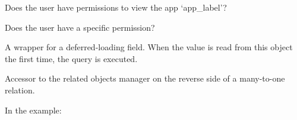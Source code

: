 \documentclass[letterpaper,10pt,english]{sphinxmanual}
\begin{document}
\begin{fulllineitems}
\begin{fulllineitems}
\end{fulllineitems}


\begin{fulllineitems}
\label{\detokenize{QuChemPedIA.models:QuChemPedIA.models.UserModel.Utilisateur.has_module_perms}}
Does the user have permissions to view the app ‘app\_label’?

\end{fulllineitems}


\begin{fulllineitems}
\label{\detokenize{QuChemPedIA.models:QuChemPedIA.models.UserModel.Utilisateur.has_perm}}
Does the user have a specific permission?

\end{fulllineitems}


\begin{fulllineitems}
\label{\detokenize{QuChemPedIA.models:QuChemPedIA.models.UserModel.Utilisateur.id}}
A wrapper for a deferred-loading field. When the value is read from this
object the first time, the query is executed.

\end{fulllineitems}


\begin{fulllineitems}
\label{\detokenize{QuChemPedIA.models:QuChemPedIA.models.UserModel.Utilisateur.importfile_set}}
Accessor to the related objects manager on the reverse side of a
many-to-one relation.

In the example:

%
\begin{sphinxVerbatim}[commandchars=\\\{\}]
 
       
\end{sphinxVerbatim}


\end{fulllineitems}
\end{fulllineitems}
\end{document}
